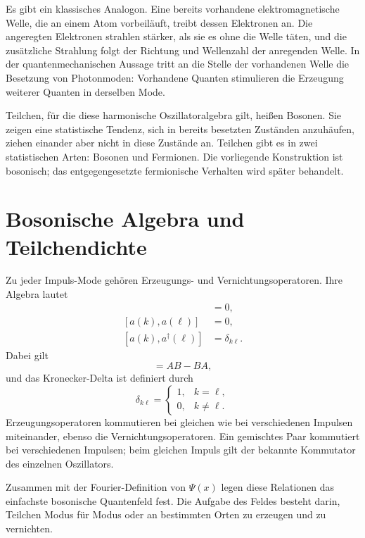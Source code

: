 Es gibt ein klassisches Analogon. Eine bereits vorhandene elektromagnetische Welle, die an einem Atom vorbeiläuft, treibt dessen Elektronen an. Die angeregten Elektronen strahlen stärker, als sie es ohne die Welle täten, und die zusätzliche Strahlung folgt der Richtung und Wellenzahl der anregenden Welle. In der quantenmechanischen Aussage tritt an die Stelle der vorhandenen Welle die Besetzung von Photonmoden: Vorhandene Quanten stimulieren die Erzeugung weiterer Quanten in derselben Mode.

Teilchen, für die diese harmonische Oszillatoralgebra gilt, heißen Bosonen. Sie zeigen eine statistische Tendenz, sich in bereits besetzten Zuständen anzuhäufen, ziehen einander aber nicht in diese Zustände an. Teilchen gibt es in zwei statistischen Arten: Bosonen und Fermionen. Die vorliegende Konstruktion ist bosonisch; das entgegengesetzte fermionische Verhalten wird später behandelt.

\section{Bosonische Algebra und Teilchendichte}

Zu jeder Impuls-Mode gehören Erzeugungs- und Vernichtungsoperatoren. Ihre Algebra lautet
\begin{align}
[a^\dagger(k),a^\dagger(\ell)]&=0,\\
[a(k),a(\ell)]&=0,\\
[a(k),a^\dagger(\ell)]&=\delta_{k\ell}.
\end{align}
Dabei gilt
\begin{equation}
[A,B]=AB-BA,
\end{equation}
und das Kronecker-Delta ist definiert durch
\begin{equation}
\delta_{k\ell}=
\begin{cases}
1,&k=\ell,\\
0,&k\ne\ell.
\end{cases}
\end{equation}
Erzeugungsoperatoren kommutieren bei gleichen wie bei verschiedenen Impulsen miteinander, ebenso die Vernichtungsoperatoren. Ein gemischtes Paar kommutiert bei verschiedenen Impulsen; beim gleichen Impuls gilt der bekannte Kommutator des einzelnen Oszillators.

Zusammen mit der Fourier-Definition von \(\Psi(x)\) legen diese Relationen das einfachste bosonische Quantenfeld fest. Die Aufgabe des Feldes besteht darin, Teilchen Modus für Modus oder an bestimmten Orten zu erzeugen und zu vernichten.

